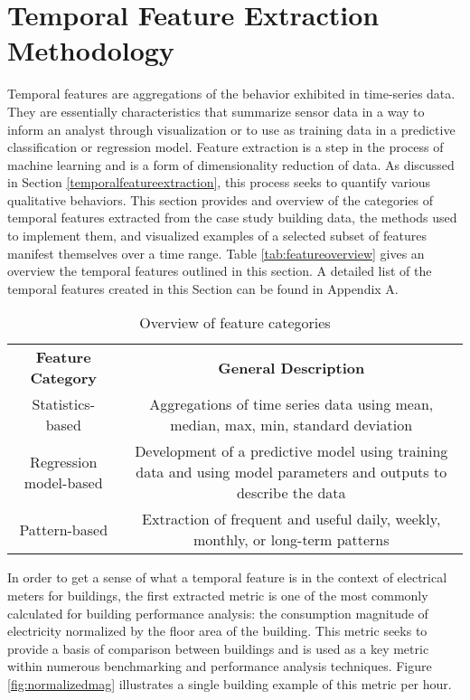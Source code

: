 \section{Temporal Feature Extraction Methodology}
\label{sec:featureextraction}

Temporal features are aggregations of the behavior exhibited in time-series data. They are essentially characteristics that summarize sensor data in a way to inform an analyst through visualization or to use as training data in a predictive classification or regression model. Feature extraction is a step in the process of machine learning and is a form of dimensionality reduction of data. As discussed in Section \ref{temporalfeatureextraction}, this process seeks to quantify various qualitative behaviors. This section provides and overview of the categories of temporal features extracted from the case study building data, the methods used to implement them, and visualized examples of a selected subset of features manifest themselves over a time range. Table \ref{tab:featureoverview} gives an overview the temporal features outlined in this section.  A detailed list of the temporal features created in this Section can be found in Appendix A. 

\begin{table} 
    \begin{tabular}{ c c }
        \textbf{Feature Category} &  \textbf{General Description}\\ 
        Statistics-based & Aggregations of time series data using mean, median, max, min, standard deviation \\ 
        Regression model-based & Development of a predictive model using training data and using model parameters and outputs to describe the data \\ 
        Pattern-based &  Extraction of frequent and useful daily, weekly, monthly, or long-term patterns\\ 
    \end{tabular} 
    \caption{Overview of feature categories}
\end{table}
\label{tab:featureoverview}

In order to get a sense of what a temporal feature is in the context of electrical meters for buildings, the first extracted metric is one of the most commonly calculated for building performance analysis: the consumption magnitude of electricity normalized by the floor area of the building. This metric seeks to provide a basis of comparison between buildings and is used as a key metric within numerous benchmarking and performance analysis techniques. Figure \ref{fig:normalizedmag} illustrates a single building example of this metric per hour.